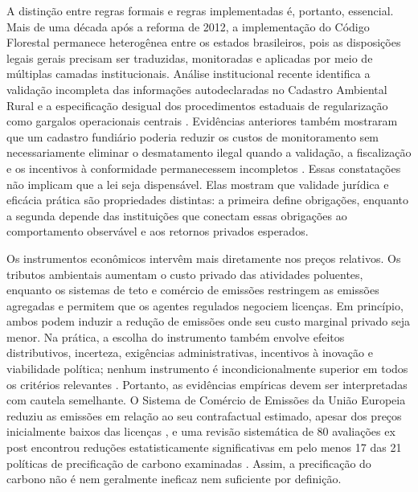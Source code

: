 A distinção entre regras formais e regras implementadas é, portanto, essencial. Mais de uma década após a reforma de 2012, a implementação do Código Florestal permanece heterogênea entre os estados brasileiros, pois as disposições legais gerais precisam ser traduzidas, monitoradas e aplicadas por meio de múltiplas camadas institucionais. Análise institucional recente identifica a validação incompleta das informações autodeclaradas no Cadastro Ambiental Rural e a especificação desigual dos procedimentos estaduais de regularização como gargalos operacionais centrais \cite{oliveira2025implementation}. Evidências anteriores também mostraram que um cadastro fundiário poderia reduzir os custos de monitoramento sem necessariamente eliminar o desmatamento ilegal quando a validação, a fiscalização e os incentivos à conformidade permanecessem incompletos \cite{azevedo2017limits}. Essas constatações não implicam que a lei seja dispensável. Elas mostram que validade jurídica e eficácia prática são propriedades distintas: a primeira define obrigações, enquanto a segunda depende das instituições que conectam essas obrigações ao comportamento observável e aos retornos privados esperados.


Os instrumentos econômicos intervêm mais diretamente nos preços relativos. Os tributos ambientais aumentam o custo privado das atividades poluentes, enquanto os sistemas de teto e comércio de emissões restringem as emissões agregadas e permitem que os agentes regulados negociem licenças. Em princípio, ambos podem induzir a redução de emissões onde seu custo marginal privado seja menor. Na prática, a escolha do instrumento também envolve efeitos distributivos, incerteza, exigências administrativas, incentivos à inovação e viabilidade política; nenhum instrumento é incondicionalmente superior em todos os critérios relevantes \cite{goulder2008instrument}. Portanto, as evidências empíricas devem ser interpretadas com cautela semelhante. O Sistema de Comércio de Emissões da União Europeia reduziu as emissões em relação ao seu contrafactual estimado, apesar dos preços inicialmente baixos das licenças \cite{bayer2020euets}, e uma revisão sistemática de 80 avaliações ex post encontrou reduções estatisticamente significativas em pelo menos 17 das 21 políticas de precificação de carbono examinadas \cite{dobbeling2024carbon}. Assim, a precificação do carbono não é nem geralmente ineficaz nem suficiente por definição.

